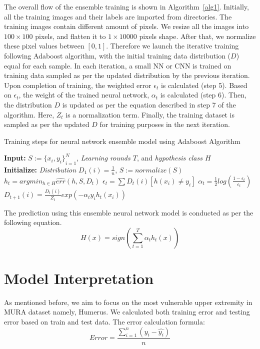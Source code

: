 \documentclass{article}
\begin{document}
The overall flow of the ensemble training is shown in Algorithm~\ref{alg1}. Initially, all the training images and their labels are imported from directories. The training images contain different amount of pixels. We resize all the images into $100\times100$ pixels, and flatten it to $1\times10000$ pixels shape. After that, we normalize these pixel values between $[0,1]$. Therefore we launch the iterative training following Adaboost algorithm, with the initial training data distribution ($D$) equal for each sample. In each iteration, a small NN or CNN is trained on training data sampled as per the updated distribution by the previous iteration. Upon completion of training, the weighted error $\epsilon_t$ is calculated (step 5). Based on $\epsilon_t$, the weight of the trained neural network, $\alpha_t$ is calculated (step 6). Then, the distribution $D$ is updated as per the equation described in step 7 of the algorithm. Here, $Z_t$ is a normalization term. Finally, the training dataset is sampled as per the updated $D$ for training purposes in the next iteration.

\begin{algorithm}[t]
    \caption{Training steps for neural network ensemble model using Adaboost Algorithm}
    \label{alg1}
\begin{algorithmic}[1]
    \STATE \textbf{Input:} $S:={\{x_i,y_i\}}_{i=1}^N$,    \textit{Learning rounds $T$}, and \textit{hypothesis class $H$}\\
    \STATE \textbf{Initialize:} \textit{Distribution $D_1(i)=\frac{1}{n}$}, $S:=normalize(S)$\\
    \STATE $h_t=arg min_{h\in{H}}\hat{err}(h,S,D_t)$
    \STATE $\epsilon_t=\sum{D_t(i)[h(x_i)\neq{y_i}]}$
    \STATE $\alpha_t=\frac{1}{2}log(\frac{1-\epsilon_t}{\epsilon_t})$
    \STATE $D_{t+1}(i)=\frac{D_t(i)}{Z_t}exp(-\alpha_ty_ih_t(x_i))$
    \ENDFOR
\end{algorithmic}
\end{algorithm}
The prediction using this ensemble neural network model is conducted as per the following equation.
\begin{equation}    
H(x)=sign(\sum_{t=1}^T\alpha_th_t(x))
\label{ensemble_predict}
\end{equation}
    

\section{Model Interpretation}
As mentioned before, we aim to focus on the most vulnerable upper extremity in MURA dataset namely, Humerus. We calculated both training error and testing error based on train and test data. The error calculation formula:
\begin{equation}
    Error=\frac{\sum_{i=1}^n(y_i-\hat{y_i})}{n}
\end{equation}
\end{document}
